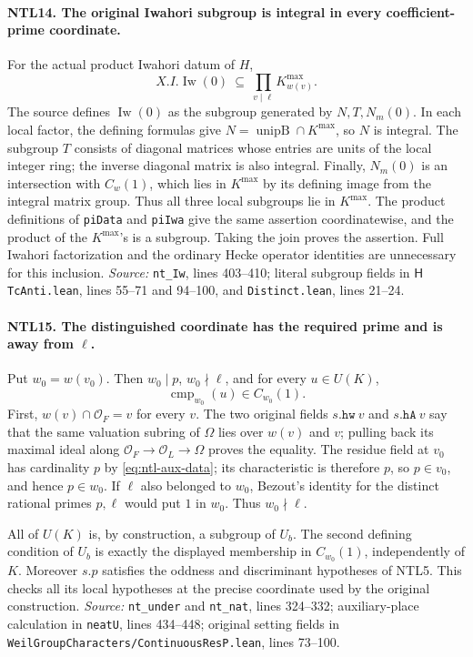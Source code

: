 \paragraph{NTL14. The original Iwahori subgroup is integral in every coefficient-prime coordinate.}
\label{claim:NTL14}
For the actual product Iwahori datum of \(H\),
\[
 X.I.\operatorname{Iw}(0)
             \ \subseteq\ \prod_{v\mid\ell}K_{w(v)}^{\max}.
\]
The source defines \(\operatorname{Iw}(0)\) as the subgroup generated
by \(N,T,N_m(0)\).  In each local factor, the defining formulas give
\(N=\operatorname{unipB}\cap K^{\max}\), so \(N\) is integral.
The subgroup \(T\) consists of diagonal matrices whose entries are
units of the local integer ring; the inverse diagonal matrix is
also integral.  Finally, \(N_m(0)\) is an intersection with
\(C_w(1)\), which lies in \(K^{\max}\) by its defining image from
the integral matrix group.  Thus all three local subgroups lie in
\(K^{\max}\).  The product definitions of \texttt{piData} and
\texttt{piIwa} give the same assertion coordinatewise, and the
product of the \(K^{\max}\)'s is a subgroup.  Taking the join proves
the assertion.  Full Iwahori factorization and the ordinary Hecke
operator identities are unnecessary for this inclusion.
\emph{Source:} \texttt{nt\_Iw}, lines 403--410; literal subgroup
fields in \(\mathsf H\)\texttt{TcAnti.lean}, lines 55--71 and 94--100,
and \texttt{Distinct.lean}, lines 21--24.

\paragraph{NTL15. The distinguished coordinate has the required prime and is away from \(\ell\).}
\label{claim:NTL15}
Put \(w_0=w(v_0)\).  Then \(w_0\mid p\), \(w_0\nmid\ell\),
and for every \(u\in U(K)\),
\[
 \operatorname{cmp}_{w_0}(u)\in C_{w_0}(1).
\]
First, \(w(v)\cap\mathcal O_F=v\) for every \(v\).  The two
original fields \(s.\texttt{hw}\ v\) and \(s.\texttt{hA}\ v\)
say that the same valuation subring of \(\Omega\) lies over
\(w(v)\) and \(v\); pulling back its maximal ideal along
\(\mathcal O_F\to\mathcal O_L\to\Omega\) proves the equality.
The residue field at \(v_0\) has cardinality \(p\) by
\eqref{eq:ntl-aux-data}; its characteristic is therefore \(p\),
so \(p\in v_0\), and hence \(p\in w_0\).
If \(\ell\) also belonged to \(w_0\), Bezout's identity for the
distinct rational primes \(p,\ell\) would put \(1\) in \(w_0\).
Thus \(w_0\nmid\ell\).

All of \(U(K)\) is, by construction, a subgroup of \(U_b\).
The second defining condition of \(U_b\) is exactly the displayed
membership in \(C_{w_0}(1)\), independently of \(K\).
Moreover \(s.p\) satisfies the oddness and discriminant hypotheses
of NTL5.  This checks all its local hypotheses at the precise
coordinate used by the original construction.
\emph{Source:} \texttt{nt\_under} and \texttt{nt\_nat}, lines
324--332; auxiliary-place calculation in \texttt{neatU}, lines
434--448; original setting fields in
\texttt{WeilGroupCharacters/}\allowbreak\texttt{ContinuousResP.lean},
lines 73--100.

